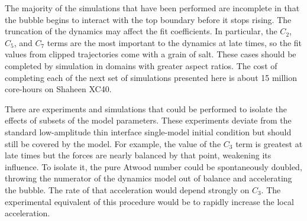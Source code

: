 The majority of the simulations that have been performed are incomplete in that the bubble begins to interact with the top boundary before it stops rising.
The truncation of the dynamics may affect the fit coefficients.
In particular, the $C_2$, $C_5$, and $C_7$ terms are the most important to the dynamics at late times, so the fit values from clipped trajectories come with a grain of salt.
These cases should be completed by simulation in domains with greater aspect ratios.
The cost of completing each of the next set of simulations presented here is about 15 million core-hours on Shaheen XC40.

There are experiments and simulations that could be performed to isolate the effects of subsets of the model parameters.
These experiments deviate from the standard low-amplitude thin interface single-model initial condition but should still be covered by the model.
For example, the value of the $C_3$ term is greatest at late times but the forces are nearly balanced by that point, weakening its influence.
To isolate it, the pure Atwood number could be spontaneously doubled, throwing the numerator of the dynamics model out of balance and accelerating the bubble.
The rate of that acceleration would depend strongly on $C_3$.
The experimental equivalent of this procedure would be to rapidly increase the local acceleration.

